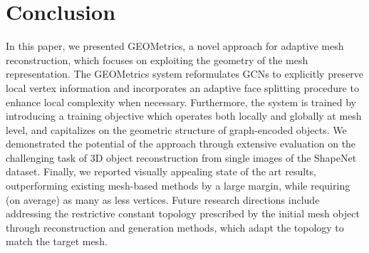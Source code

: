 \documentclass{article}
\begin{document}
\section{Conclusion}

In this paper, we presented GEOMetrics, a novel approach for adaptive mesh reconstruction, which focuses on exploiting the geometry of the mesh representation. The GEOMetrics system reformulates GCNs to explicitly preserve local vertex information and incorporates an adaptive face splitting procedure to enhance local complexity when necessary. Furthermore, the system is trained by introducing a training objective which operates both locally and globally at mesh level, and capitalizes on the geometric structure of graph-encoded objects. We demonstrated the potential of the approach through extensive evaluation on the challenging task of 3D object reconstruction from single images of the ShapeNet dataset. Finally, we reported visually appealing state of the art results, outperforming existing mesh-based methods by a large margin, while requiring (on average) as many as  less vertices. Future research directions include addressing the restrictive constant topology prescribed by the initial mesh object through reconstruction and generation methods, which adapt the topology to match the target mesh.
\end{document}
